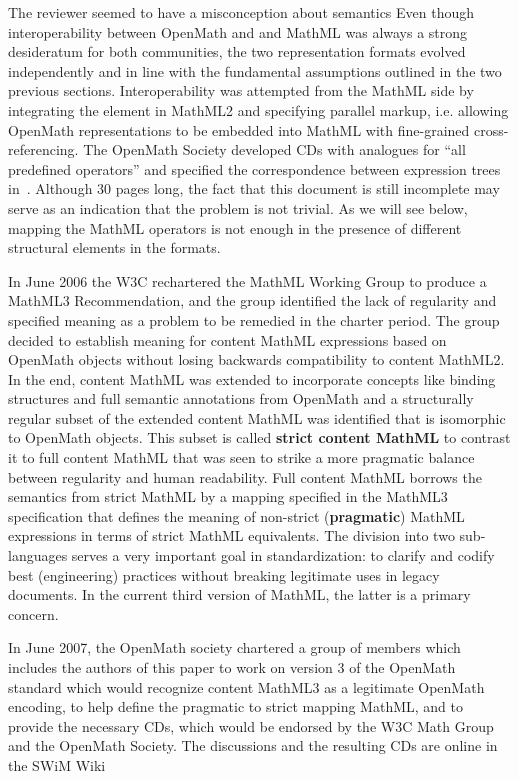 \documentclass{llncs}
\begin{document}
\begin{newpart}{The reviewer seemed to have a misconception about semantics}
Even though interoperability between OpenMath and and MathML was always a strong
desideratum for both communities, the two representation formats evolved independently and
in line with the fundamental assumptions outlined in the two previous
sections. Interoperability was attempted from the MathML side by integrating the
{} element in MathML2 and specifying parallel markup, i.e. allowing
OpenMath representations to be embedded into MathML with fine-grained
cross-referencing. The OpenMath Society developed CDs with analogues for ``all predefined
operators'' and specified the correspondence between expression trees
in~\cite{CarDAvDew:cbmao01}. Although 30 pages long, the fact that this document is still
incomplete may serve as an indication that the problem is not trivial. As we will see
below, mapping the MathML operators is not enough in the presence of different structural
elements in the formats.

In June 2006 the W3C rechartered the MathML Working Group to produce a MathML3
Recommendation, and the group identified the lack of regularity and specified meaning as a
problem to be remedied in the charter period. The group decided to establish meaning for
content MathML expressions based on OpenMath objects without losing backwards
compatibility to content MathML2. In the end, content MathML was extended to incorporate
concepts like binding structures and full semantic annotations from OpenMath and a
structurally regular subset of the extended content MathML was identified that is
isomorphic to OpenMath objects. This subset is called {\textbf{strict content MathML}} to
contrast it to full content MathML that was seen to strike a more pragmatic balance
between regularity and human readability. Full content MathML borrows the semantics from
strict MathML by a mapping specified in the MathML3 specification that defines the meaning
of non-strict ({\textbf{pragmatic}}) MathML expressions in terms of strict MathML
equivalents. The division into two sub-languages serves a very important goal in
standardization: to clarify and codify best (engineering) practices without breaking
legitimate uses in legacy documents. In the current third version of MathML, the latter is
a primary concern. 

In June 2007, the OpenMath society chartered a group of members which includes the authors
of this paper to work on version 3 of the OpenMath standard which would recognize content
MathML3 as a legitimate OpenMath encoding, to help define the pragmatic to strict mapping
MathML, and to provide the necessary CDs, which would be endorsed by the W3C Math Group
and the OpenMath Society. The discussions and the resulting CDs are online in the SWiM
Wiki~\cite{LangeGonzalez:SWiM-Sentido08,OpenMathWiki}


\end{newpart}
\end{document}
